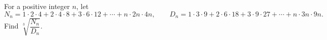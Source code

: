 For a positive integer $n$, let
\[N_n=1\cdot2\cdot4+2\cdot4\cdot8+3\cdot6\cdot12+\cdots+n\cdot2n\cdot4n,\qquad D_n=1\cdot3\cdot9+2\cdot6\cdot18+3\cdot9\cdot27+\cdots+n\cdot3n\cdot9n.\]
Find $\sqrt[3]{\dfrac{N_n}{D_n}}$.
